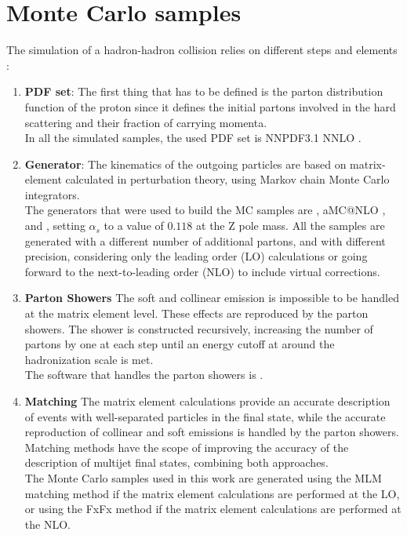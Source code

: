 \section{Monte Carlo samples}\label{sec:MC}
The simulation of a hadron-hadron collision relies on different steps and elements \cite{Bierlich2022A8.3}:
\begin{enumerate}
    \item \textbf{PDF set}: The first thing that has to be defined is the parton distribution function of the proton since it defines the initial partons involved in the hard scattering and their fraction of carrying momenta.\\
    In all the simulated samples, the used PDF set is NNPDF3.1 NNLO \cite{TheNNPDFCollaboration2017PartonData}.
    \item \textbf{Generator}: The kinematics of the outgoing particles are based on matrix-element calculated in perturbation theory, using Markov chain Monte Carlo integrators.\\
    The generators that were used to build the MC samples are , aMC@NLO \cite{Alwall2011MadGraphBeyond}, and  \cite{Alioli2010ABOX}, setting $\alpha_s$ to a value of $0.118$ at the Z pole mass.
    All the samples are generated with a different number of additional partons, and with different precision, \ie considering only the leading order (LO) calculations or going forward to the next-to-leading order (NLO) to include virtual corrections.

    \item \textbf{Parton Showers}
    The soft and collinear emission is impossible to be handled at the matrix element level. These effects are reproduced by the parton showers.
    The shower is constructed recursively, increasing the number of partons by one at each step until an energy cutoff at around the hadronization scale is met.\\
    The software that handles the parton showers is \PYTHIA \cite{Bierlich2022A8.3}.

    \item \textbf{Matching}
    The matrix element calculations provide an accurate description of events with well-separated particles in the final state, while the accurate reproduction of collinear and soft emissions is handled by the parton showers.\\
    Matching methods have the scope of improving the accuracy of the description of multijet final states, combining both approaches.\\
    The Monte Carlo samples used in this work are generated using the MLM matching method \cite{Mangano2006MatchingCollisions} if the matrix element calculations are performed at the LO, or using the FxFx method \cite{Frederix2012MergingMCNLO} if the matrix element calculations are performed at the NLO. 


\end{enumerate}
